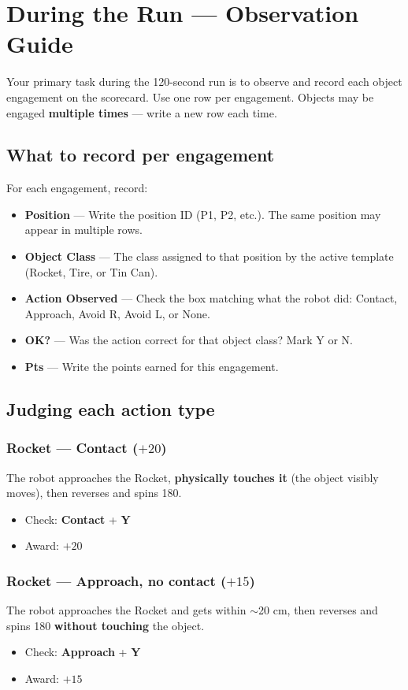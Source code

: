 \documentclass[a4]{article}
\begin{document}
\pagebreak
\section*{During the Run --- Observation Guide}

Your primary task during the 120-second run is to observe and record each object engagement on the scorecard. Use one row per engagement. Objects may be engaged \textbf{multiple times} --- write a new row each time.

\subsection*{What to record per engagement}

For each engagement, record:
\begin{itemize}
    \item \textbf{Position} --- Write the position ID (P1, P2, etc.). The same position may appear in multiple rows.
    \item \textbf{Object Class} --- The class assigned to that position by the active template (Rocket, Tire, or Tin Can).
    \item \textbf{Action Observed} --- Check the box matching what the robot did: Contact, Approach, Avoid R, Avoid L, or None.
    \item \textbf{OK?} --- Was the action correct for that object class? Mark Y or N.
    \item \textbf{Pts} --- Write the points earned for this engagement.
\end{itemize}

\subsection*{Judging each action type}

\subsubsection*{Rocket --- Contact ($+20$)}
The robot approaches the Rocket, \textbf{physically touches it} (the object visibly moves), then reverses and spins 180\textdegree.
\begin{itemize}
    \item Check: \textbf{Contact} + \textbf{Y}
    \item Award: $+20$
\end{itemize}

\subsubsection*{Rocket --- Approach, no contact ($+15$)}
The robot approaches the Rocket and gets within $\sim$20 cm, then reverses and spins 180\textdegree{} \textbf{without touching} the object.
\begin{itemize}
    \item Check: \textbf{Approach} + \textbf{Y}
    \item Award: $+15$
\end{itemize}
\end{document}
